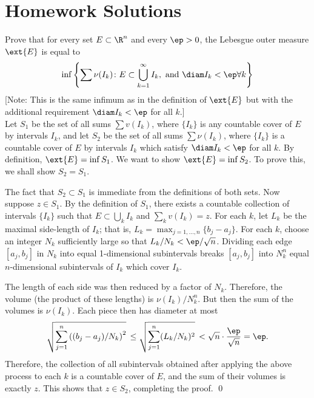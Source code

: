 \newpage
\section{Homework Solutions}

\begin{hwsol}
Prove that for every set $E \subset \R^n$ and every $\ep>0$, the Lebesgue outer measure $\ext{E}$ is equal to
	\[
	\inf \left\{ \sum \nu(I_k) \colon  E \subset \bigcup_{k=1}^\infty I_k, \text{ and } \diam I_k < \ep \forall k \right\}
	\]
[Note: This is the same infimum as in the definition of $\ext{E}$ but with the additional requirement $\diam I_k < \ep$ for all $k$.] \\

\pf Let $S_1$ be the set of all sums $\sum v(I_k)$, where $\{I_k\}$ is any countable cover of $E$ by intervals $I_k$, and let $S_2$ be the set of all sums $\sum \nu(I_k)$, where $\{I_k\}$ is a countable cover of $E$ by intervals $I_k$ which satisfy $\diam I_k < \ep$ for all $k$. By definition, $\ext{E}= \inf S_1$. We want to show $\ext{E}= \inf S_2$. To prove this, we shall show $S_2=S_1$.

The fact that $S_2 \subset S_1$ is immediate from the definitions of both sets. Now suppose $z \in S_1$. By the definition of $S_1$, there exists a countable collection of intervals $\{I_k\}$ such that $E \subset \bigcup_k I_k$ and $\sum_k v(I_k)= z$. For each $k$, let $L_k$ be the maximal side-length of $I_k$; that is, $L_k= \max_{j=1,\ldots, n} \{ b_j-a_j \}$. For each $k$, choose an integer $N_k$ sufficiently large so that $L_k/N_k < \ep/\sqrt{n}$. Dividing each edge $[a_j, b_j]$ in $N_k$ into equal 1-dimensional subintervals breaks $[a_j,b_j]$ into $N_k^n$ equal $n$-dimensional subintervals of $I_k$ which cover $I_k$. 

The length of each side was then reduced by a factor of $N_k$. Therefore, the volume (the product of these lengths) is $\nu(I_k)/N_k^n$. But then the sum of the volumes is $\nu(I_k)$. Each piece then has diameter at most 
	\[
	\sqrt{\sum_{j=1}^n \left( (b_j-a_j)/N_k \right)^2} \,\leq  \sqrt{\sum_{j=1}^n (L_k/N_k)^2} \,< \sqrt{n} \cdot \dfrac{\ep}{\sqrt{n}}= \ep.
	\]
Therefore, the collection of all subintervals obtained after applying the above process to each $k$ is a countable cover of $E$, and the sum of their volumes is exactly $z$. This shows that $z \in S_2$, completing the proof. \qed \\
\end{hwsol}


